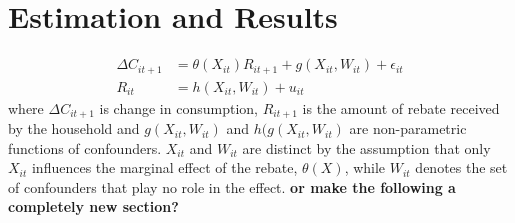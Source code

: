 \section{Estimation and Results} \label{sec:estim_res}
\begin{align}
    \Delta C_{it+1}&=\theta(X_{it})R_{it+1}+g(X_{it}, W_{it})+\epsilon_{it} \label{eq:plm_C1}\\
    R_{it}&=h(X_{it}, W_{it})+u_{it} \label{eq:plm_C2}
\end{align}
where $\Delta C_{it+1}$ is change in consumption, $R_{it+1}$ is the amount of rebate received by the household and $g(X_{it}, W_{it})$ and $h(g(X_{it}, W_{it})$ are non-parametric functions of confounders. $X_{it}$ and $W_{it}$ are distinct by the assumption that only $X_{it}$ influences the marginal effect of the rebate, $\theta(X)$, while $W_{it}$ denotes the set of confounders that play no role in the effect.
\textbf{or make the following a completely new section?}
